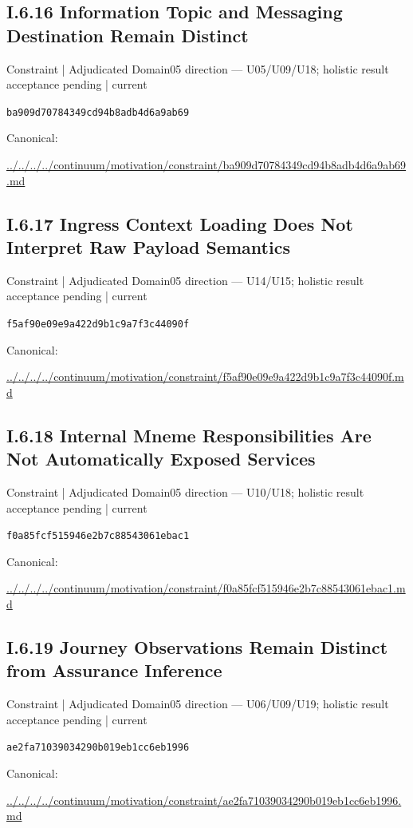 \documentclass[10pt,a4paper]{article}
\begin{document}
\subsection*{I.6.16 Information Topic and Messaging Destination Remain Distinct}
{\small Constraint | Adjudicated Domain05 direction — U05/U09/U18; holistic result acceptance pending | current}\par
\texttt{ba909d70784349cd94b8adb4d6a9ab69}\par
Canonical: \par
{\footnotesize\url{../../../../continuum/motivation/constraint/ba909d70784349cd94b8adb4d6a9ab69.md}}\par
\subsection*{I.6.17 Ingress Context Loading Does Not Interpret Raw Payload Semantics}
{\small Constraint | Adjudicated Domain05 direction — U14/U15; holistic result acceptance pending | current}\par
\texttt{f5af90e09e9a422d9b1c9a7f3c44090f}\par
Canonical: \par
{\footnotesize\url{../../../../continuum/motivation/constraint/f5af90e09e9a422d9b1c9a7f3c44090f.md}}\par
\subsection*{I.6.18 Internal Mneme Responsibilities Are Not Automatically Exposed Services}
{\small Constraint | Adjudicated Domain05 direction — U10/U18; holistic result acceptance pending | current}\par
\texttt{f0a85fcf515946e2b7c88543061ebac1}\par
Canonical: \par
{\footnotesize\url{../../../../continuum/motivation/constraint/f0a85fcf515946e2b7c88543061ebac1.md}}\par
\subsection*{I.6.19 Journey Observations Remain Distinct from Assurance Inference}
{\small Constraint | Adjudicated Domain05 direction — U06/U09/U19; holistic result acceptance pending | current}\par
\texttt{ae2fa71039034290b019eb1cc6eb1996}\par
Canonical: \par
{\footnotesize\url{../../../../continuum/motivation/constraint/ae2fa71039034290b019eb1cc6eb1996.md}}\par
\end{document}
